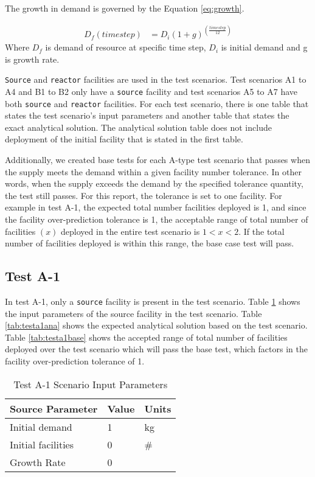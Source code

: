 \documentclass[11pt,letterpaper]{article}
\begin{document}
The growth in demand is governed by the Equation \ref{eq:growth}. 

\begin{align}
\label{eq:growth}
D_f(timestep) &= D_i(1+g)^{(\frac{timestep}{12})}
\end{align}
Where $D_f$ is demand of resource at specific time step, $D_i$ is initial demand and g is growth rate. 

\texttt{Source} and \texttt{reactor} facilities are used in the test scenarios. Test scenarios A1 to A4 and B1 to B2 only have a \texttt{source} facility and test scenarios A5 to A7 have both \texttt{source} and \texttt{reactor} facilities. For each test scenario, there is one table that states the test scenario's input parameters and another table that states the exact analytical solution. The analytical solution table does not include deployment of the initial facility that is stated in the first table.

Additionally, we created base tests for each A-type test scenario that passes when the supply meets the demand within a given facility number tolerance. In other words, when the supply exceeds the demand by the specified tolerance quantity, the test still passes. For this report, the tolerance is set to one facility. For example in test A-1, the expected total number facilities deployed is 1, and since the facility over-prediction tolerance is 1, the acceptable range of total number of facilities $(x)$ deployed in the entire test scenario is $1<x<2$. If the total number of facilities deployed is within this range, the base case test will pass.  

\subsection{Test A-1}
In test A-1, only a \texttt{source} facility is present in the test scenario. Table \ref{tab:testa1} shows the input parameters of the source facility in the test scenario. Table \ref{tab:testa1ana} shows the expected analytical solution based on the test scenario. Table \ref{tab:testa1base} shows the accepted range of total number of facilities deployed over the test scenario which will pass the base test, which factors in the facility over-prediction tolerance of 1. 
\begin{table}[H]
	\centering
	\caption{Test A-1 Scenario Input Parameters }
	\label{tab:testa1}
	\begin{tabular}{|l|l|l|}
		\hline
		\textbf{Source Parameter} & \textbf{Value} & \textbf{Units} \\
		\hline
		Initial demand & 1 & kg \\
		Initial facilities & 0 & \#\\
		Growth Rate & 0 & \\
\hline
	\end{tabular}
\end{table}
\end{document}
